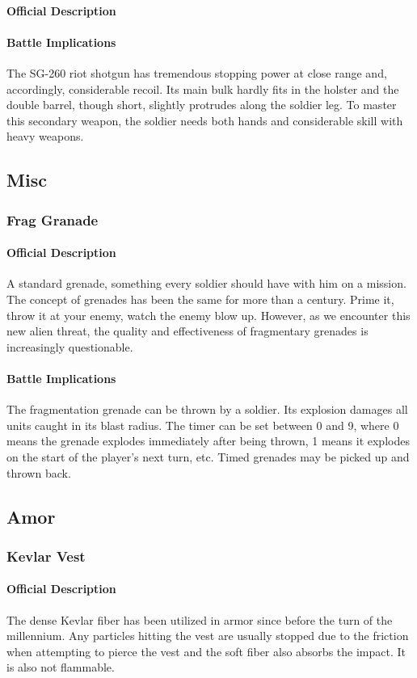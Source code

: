 \paragraph*{Official Description}
\paragraph*{Battle Implications}
The SG-260 riot shotgun has tremendous stopping power at close range and, accordingly, considerable recoil. Its main bulk hardly fits in the holster and the double barrel, though short, slightly protrudes along the soldier leg. To master this secondary weapon, the soldier needs both hands and considerable skill with heavy weapons. 
\subsection{Misc}
\subsubsection*{Frag Granade}
\paragraph*{Official Description}
A standard grenade, something every soldier should have with him on a mission. The concept of grenades has been the same for more than a century. Prime it, throw it at your enemy, watch the enemy blow up. However, as we encounter this new alien threat, the quality and effectiveness of fragmentary grenades is increasingly questionable.
\paragraph*{Battle Implications}
The fragmentation grenade can be thrown by a soldier. Its explosion damages all units caught in its blast radius. The timer can be set between 0 and 9, where 0 means the grenade explodes immediately after being thrown, 1 means it explodes on the start of the player's next turn, etc. Timed grenades may be picked up and thrown back.
\subsection{Amor}
\subsubsection*{Kevlar Vest}
\paragraph*{Official Description}
The dense Kevlar fiber has been utilized in armor since before the turn of the millennium. Any particles hitting the vest are usually stopped due to the friction when attempting to pierce the vest and the soft fiber also absorbs the impact. It is also not flammable.
